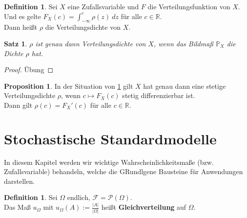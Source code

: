 \documentclass[10pt,a4paper]{article}
\newcommand{\R}{\ensuremath{\mathbb{R}}}
\newcommand{\Potset}{\mathscr P}
\newcommand{\Prb}{\mathbb P}
\newcommand{\scF}{\ensuremath{\mathscr{F}}}
\theoremstyle{plain}
\newtheorem{satz}[theorem]{Satz}
\theoremstyle{definition}
\newtheorem{definition}[theorem]{Definition}
\newtheorem{prop}[theorem]{Proposition}
\theoremstyle{remark}
\begin{document}
	\begin{definition}\label{0144def}
		Sei $X$ eine Zufallsvariable und $F$ die Verteilungsfunktion von $X$. Und es gelte $F_X(c)=\int_{-\infty}^{c}\rho(z)~dz$ für alle $c\in\R$.\\
		Dann heißt $\rho$ die Verteilungsdichte von $X$.
	\end{definition}
	\addtocounter{theorem}{-1}
	\begin{satz}\label{0144satz}
		$\rho$ ist genau dann Verteilungsdichte von $X$, wenn das Bildmaß $\Prb_X$ die Dichte $\rho$ hat.
	\end{satz}
	\begin{proof}
		Übung %
	\end{proof}

	\begin{prop}\label{0145prop}
		In der Situation von \ref{0144satz} gilt $X$ hat genau dann eine stetige Verteilungsdichte $\rho$, wenn  $c\mapsto F_X(c)$ stetig differenzierbar ist.\\
		Dann gilt $\rho(c)=F_X'(c)$ für alle $c\in\R$.
	\end{prop}






\section{Stochastische Standardmodelle}
		In diesem Kapitel werden wir wichtige Wahrscheinlichkeitsmaße (bzw. Zufallsvariable) behandeln, welche die GRundlgene Bausteine für Anwendungen darstellen.
		
	\begin{definition}\label{0201def}
		Sei $\Omega$ endlich, $\scF=\Potset(\Omega)$.\\
		Das Maß $u_\Omega$ mit $u_\Omega(A):=\frac{|A|}{|\Omega|}$ heißt \textbf{Gleichverteilung} auf $\Omega$.
	\end{definition}
	
\end{document}
